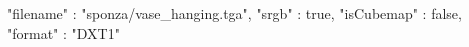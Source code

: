 { 
	"filename" : "sponza/vase_hanging.tga", 
	"srgb" : true,
	"isCubemap" : false,
	"format" : "DXT1"
}